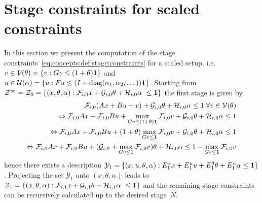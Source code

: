 \section{Stage constraints for scaled constraints}\label{sec:stage:constraints:scaled}
%
In this section we present the computation of the stage constraints~\eqref{eq:concepts:def:stage:constraints}
for a scaled setup, i.e.~$v\in\mathcal V(\theta)=\{v:Gv\leq(1+\theta){\bf{1}}\}$ and $u\in\mathcal U(\alpha) = \{
u:Fu\leq(I+\text{diag}(\alpha_1,\alpha_2,\dots)){\bf{1}}\}$.
%
Starting from~$\mathcal Z^\infty = \mathcal Z_0 = \{(x,\theta,\alpha): \mathcal F_{i,0}x + \mathcal G_{i,0}\theta + 
\mathcal H_{i,0}\alpha \leq {\bf{1}}\}$ the first stage is given by
%
\begin{equation}\begin{split}
	\mathcal F_{i,0}(Ax + Bu + v) +\mathcal G_{i,0}\theta +\mathcal H_{i,0}\alpha\leq1\;\forall v\in\mathcal V(\theta)\\
	\Leftrightarrow\mathcal F_{i,0}Ax + \mathcal F_{i,0}Bu + \max_{Gv\leq(1+\theta){\bf{1}} } \mathcal F_{i,0} v 
	+\mathcal G_{i,0}\theta +\mathcal H_{i,0}\alpha\leq1\\
	 \Leftrightarrow\mathcal F_{i,0}Ax + \mathcal F_{i,0}Bu + (1+\theta)\max_{Gv\leq{\bf{1}} } \mathcal F_{i,0} v 
	+\mathcal G_{i,0}\theta +\mathcal H_{i,0}\alpha\leq1\\
	 \Leftrightarrow\mathcal F_{i,0}Ax + \mathcal F_{i,0}Bu 
	+(\mathcal G_{i,0}+\max_{Gv\leq{\bf{1}} } \mathcal F_{i,0} v) \theta +\mathcal H_{i,0}\alpha\leq1- \max_{Gv\leq{\bf{1}} } \mathcal F_{i,0} v
\end{split}\end{equation}
%
hence there exists a description $\mathcal Y_1 = \{(x,u,\theta,\alpha): E_1^x x + E_1^u u + E_1^\theta \theta + E_1^\alpha \alpha\leq{\bf{1}}\}$.
%
Projecting the set $\mathcal Y_1$ onto $(x,\theta,\alpha)$ leads to $\mathcal Z_1 = \{(x,\theta,\alpha): \mathcal F_{i,1}x + \mathcal G_{i,1}\theta + 
\mathcal H_{i,1}\alpha \leq {\bf{1}}\}$ and the remaining stage constraints can be recursively calculated up to the desired stage~$N$.
